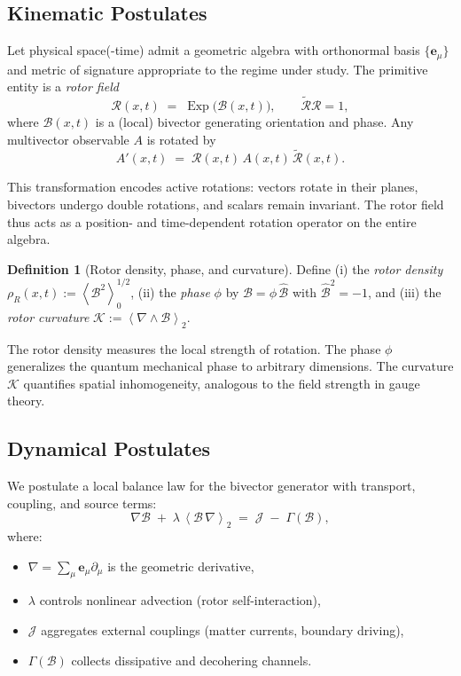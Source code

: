 \documentclass[11pt,a4paper]{article}
\newcommand{\e}{\mathbf{e}}
\newcommand{\grade}[2]{\left\langle #1 \right\rangle_{#2}}
\newcommand{\scal}[1]{\grade{#1}{0}}
\newcommand{\biv}[1]{\grade{#1}{2}}
\newcommand{\rev}[1]{\widetilde{#1}}           %
\newcommand{\Exp}{\operatorname{Exp}}
\newcommand{\Rotor}{\mathcal{R}}
\newcommand{\Biv}{\mathcal{B}}
\newcommand{\D}{\nabla}                        %
\theoremstyle{definition}
\newtheorem{definition}{Definition}
\theoremstyle{plain}
\theoremstyle{remark}
\begin{document}
\subsection{Kinematic Postulates}

Let physical space(-time) admit a geometric algebra with orthonormal basis $\{\e_\mu\}$ and metric of signature appropriate to the regime under study. The primitive entity is a \emph{rotor field}
\begin{equation}
  \Rotor(x,t) \;=\; \Exp\!\big(\Biv(x,t)\big),
  \qquad \rev{\Rotor}\Rotor = 1,
  \label{eq:rotor}
\end{equation}
where $\Biv(x,t)$ is a (local) bivector generating orientation and phase. Any multivector observable $A$ is rotated by
\begin{equation}
  A'(x,t) \;=\; \Rotor(x,t)\, A(x,t)\, \rev{\Rotor}(x,t).
\end{equation}

This transformation encodes active rotations: vectors rotate in their planes, bivectors undergo double rotations, and scalars remain invariant. The rotor field thus acts as a position- and time-dependent rotation operator on the entire algebra.

\begin{definition}[Rotor density, phase, and curvature]
Define (i) the \emph{rotor density} $\rho_R(x,t):=\scal{\Biv^2}^{1/2}$, (ii) the \emph{phase} $\phi$ by $\Biv=\phi\,\hat{\Biv}$ with $\hat{\Biv}^2=-1$, and (iii) the \emph{rotor curvature} $\mathcal{K}:=\biv{\D \wedge \Biv}$.
\end{definition}

The rotor density measures the local strength of rotation. The phase $\phi$ generalizes the quantum mechanical phase to arbitrary dimensions. The curvature $\mathcal{K}$ quantifies spatial inhomogeneity, analogous to the field strength in gauge theory.

\subsection{Dynamical Postulates}

We postulate a local balance law for the bivector generator with transport, coupling, and source terms:
\begin{equation}
  \D \Biv \;+\; \lambda\, \biv{\Biv\,\D} \;=\; \mathcal{J} \;-\; \Gamma(\Biv),
  \label{eq:rotor-dynamics}
\end{equation}
where:
\begin{itemize}[leftmargin=*,itemsep=2pt]
  \item $\D = \sum_\mu \e_\mu \partial_\mu$ is the geometric derivative,
  \item $\lambda$ controls nonlinear advection (rotor self-interaction),
  \item $\mathcal{J}$ aggregates external couplings (matter currents, boundary driving),
  \item $\Gamma(\Biv)$ collects dissipative and decohering channels.
\end{itemize}
\end{document}
